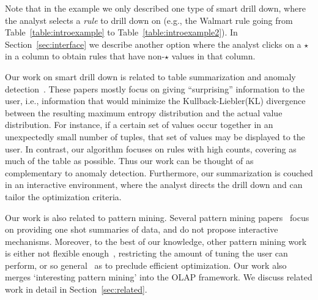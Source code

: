 \documentclass[10pt,journal,compsoc]{IEEEtran}
\begin{document}
Note that in the example we only described one type of smart drill down,
where the analyst selects a {\em rule} to drill down on
(e.g., the Walmart rule going from Table~\ref{table:introexample} to
Table~\ref{table:introexample2}).
In Section~\ref{sec:interface} we describe another option
where the analyst clicks on a $\star$ in a column to obtain
rules that have non-$\star$ values in that column.

Our work on smart drill down is related
to table summarization and anomaly
detection~\cite{Sarawagi:2001:UMA:767141.767148,
Sarawagi00user-adaptiveexploration,
Sarawagi98discovery-drivenexploration,
DBLP:journals/pvldb/GebalyAGKS14}.
These papers mostly focus on
giving ``surprising'' information to the user, i.e., information
that would minimize the Kullback-Liebler(KL) divergence between the
resulting maximum entropy distribution and the actual value distribution. For instance, if a certain set of
values occur together in an unexpectedly small number of tuples, that
set of values may be displayed to the user. In contrast, our algorithm
focuses on rules with high counts, covering as
much of the table as possible. Thus our work can be thought of as complementary to anomaly detection.
Furthermore, our summarization is couched in
an interactive environment, where the analyst
directs the drill down and can tailor the optimization criteria.

Our work is also related to pattern mining. Several pattern mining papers~\cite{Vreeken:2011:KMI:1969593.1969615,Bringmann:2007:ICDM,Yan:2005:SIP:1081870.1081907} focus on providing one shot summaries of data, and do not propose interactive mechanisms. Moreover, to the best of our knowledge, other pattern mining work is either not flexible enough~\cite{Goethals:2011:MFI:2020408.2020529,Tatti:2014:FRI:2676651.2656261,DeBie:2010:FMI:1816112.1816117}, restricting the amount of tuning the user can perform, or so general~\cite{Leeuwen:2012:DSS:2347179.2347243} as to preclude efficient optimization. Our work also merges `interesting pattern mining' into the OLAP framework. We discuss related work in detail in Section~\ref{sec:related}.
\end{document}
